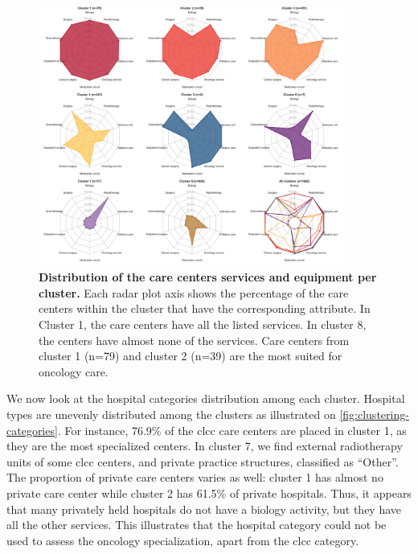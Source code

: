 \begin{figure}[H]
    \includegraphics[width=0.9\textwidth]{images/camion/fig1_clusters_services.png}
    \centering
    \caption{ \textbf{Distribution of the care centers services and equipment
            per cluster.} Each radar plot axis shows the percentage of the care
        centers within the cluster that have the corresponding attribute. In
        Cluster 1, the care centers have all the listed services. In cluster 8,
        the centers have almost none of the services. Care centers from cluster
        1 (n=79) and cluster 2 (n=39) are the most suited for oncology care. }
    \label{fig:clustering-spider}
\end{figure}

We now look at the hospital categories distribution among each cluster. Hospital
types are unevenly distributed among the clusters as illustrated on
\cref{fig:clustering-categories}. For instance, 76.9\% of the \ac{clcc} care
centers are placed in cluster 1, as they are the most specialized centers. In
cluster 7, we find external radiotherapy units of some \ac{clcc} centers, and
private practice structures, classified as ``Other''. The proportion of private
care centers varies as well: cluster 1 has almost no private care center while
cluster 2 has 61.5\% of private hospitals. Thus, it appears that many privately
held hospitals do not have a biology activity, but they have all the other
services. This illustrates that the hospital category could not be used to
assess the oncology specialization, apart from the \ac{clcc} category.


